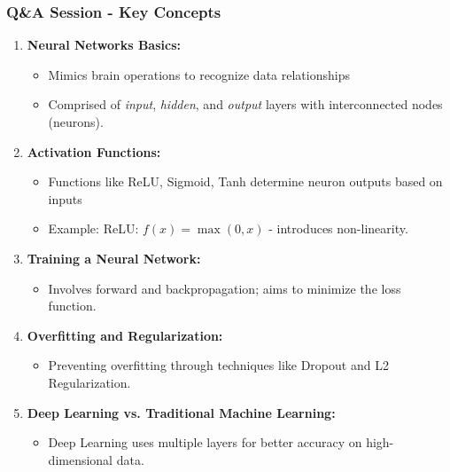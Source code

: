 \documentclass[aspectratio=169]{beamer}
\begin{document}
\begin{frame}[fragile]
  \frametitle{Q\&A Session - Key Concepts}
  \begin{enumerate}
    \item \textbf{Neural Networks Basics:}
      \begin{itemize}
        \item Mimics brain operations to recognize data relationships
        \item Comprised of \textit{input}, \textit{hidden}, and \textit{output} layers with interconnected nodes (neurons).
      \end{itemize}

    \item \textbf{Activation Functions:}
      \begin{itemize}
        \item Functions like ReLU, Sigmoid, Tanh determine neuron outputs based on inputs
        \item Example: ReLU: $f(x) = \max(0, x)$ - introduces non-linearity.
      \end{itemize}

    \item \textbf{Training a Neural Network:}
      \begin{itemize}
        \item Involves forward and backpropagation; aims to minimize the loss function.
      \end{itemize}

    \item \textbf{Overfitting and Regularization:}
      \begin{itemize}
        \item Preventing overfitting through techniques like Dropout and L2 Regularization.
      \end{itemize}

    \item \textbf{Deep Learning vs. Traditional Machine Learning:}
      \begin{itemize}
        \item Deep Learning uses multiple layers for better accuracy on high-dimensional data.
      \end{itemize}
  \end{enumerate}
\end{frame}
\end{document}

